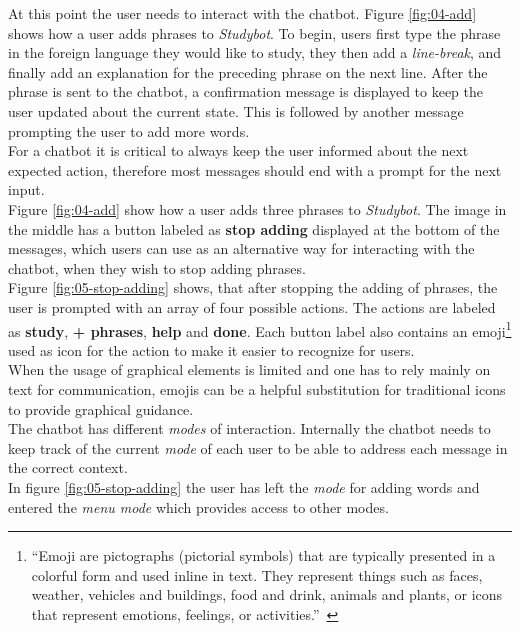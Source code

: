 At this point the user needs to interact with the chatbot.
Figure \ref{fig:04-add} shows how a user adds phrases to \emph{Studybot}.
To begin, users first type the phrase in the foreign language they would like to study,
they then add a \emph{line-break},
and finally add an explanation for the preceding phrase on the next line.
After the phrase is sent to the chatbot,
a confirmation message is displayed to keep the user updated about the current state.
This is followed by another message prompting the user to add more words.
\\

For a chatbot it is critical to always keep the user informed about the next expected action,
therefore most messages should end with a prompt for the next input.
\\

Figure \ref{fig:04-add} show how a user adds three phrases to \emph{Studybot}.
The image in the middle has a button labeled as \textbf{stop adding} displayed at the bottom of the messages,
which users can use as an alternative way for interacting with the chatbot, when they wish to stop adding phrases.
\\

Figure \ref{fig:05-stop-adding} shows, that after stopping the adding of phrases, the user is prompted with an array of four possible actions.
The actions are labeled as \textbf{study}, \textbf{+ phrases}, \textbf{help} and \textbf{done}.
Each button label also contains an emoji\footnote{``Emoji are pictographs (pictorial symbols) that are typically presented in a colorful form and used inline in text. They represent things such as faces, weather, vehicles and buildings, food and drink, animals and plants, or icons that represent emotions, feelings, or activities.''~\cite{emoji}} used as icon for the action to make it easier to recognize for users.
\\
When the usage of graphical elements is limited and one has to rely mainly on text for communication,
emojis can be a helpful substitution for traditional icons to provide graphical guidance.
\\

The chatbot has different \emph{modes} of interaction.
Internally the chatbot needs to keep track of the current \emph{mode} of each user to be able
to address each message in the correct context.
\\
In figure \ref{fig:05-stop-adding} the user has left the \emph{mode} for adding words
and entered the \emph{menu mode} which provides access to other modes.
\\

